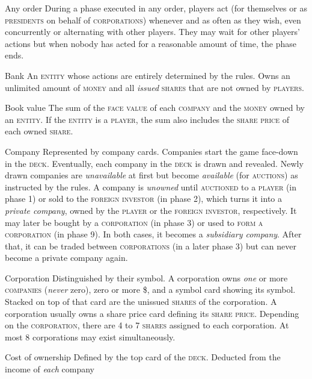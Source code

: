 \documentclass[11pt,a4paper]{article}
\newenvironment{my_description}
  {\begin{list}{}{\setlength{\labelwidth}{0pt}
   \leftmargin=1.2em
   \setlength{\itemindent}{-\leftmargin}
   \renewcommand{\makelabel}{\descriptionlabel}}
  \setlength{\itemsep}{1pt}
  \setlength{\parskip}{0pt}
  \setlength{\parsep}{0pt}
  }
  {\end{list}}
\begin{document}
\begin{multicols}{2}
{\begin{my_description}
\item[Any order] During a phase executed in any order, players act (for
  themselves or as \textsc{presidents} on behalf of
  \textsc{corporations}) whenever and as often as they wish, even
  concurrently or alternating with other players. They may wait for
  other players' actions but when nobody has acted for a reasonable
  amount of time, the phase ends.
\item[Bank] An \textsc{entity} whose actions are entirely determined
  by the rules. Owns an unlimited amount of \textsc{money} and all
  \emph{issued} \textsc{shares} that are not owned by
  \textsc{players}.
\item[Book value] The sum of the \textsc{face value} of each
  \textsc{company} and the \textsc{money} owned by an
  \textsc{entity}. If the \textsc{entity} is a \textsc{player}, the
  sum also includes the \textsc{share price} of each owned
  \textsc{share}.
\item[Company] Represented by company cards. Companies start the game
  face-down in the \textsc{deck}. Eventually, each company in the
  \textsc{deck} is drawn and revealed. Newly drawn companies are
  \emph{unavailable} at first but become \emph{available} (for
  \textsc{auctions}) as instructed by the rules. A company is
  \emph{unowned} until \textsc{auctioned} to a \textsc{player} (in
  phase 1) or sold to the \textsc{foreign investor} (in phase 2),
  which turns it into a \emph{private company}, owned by the
  \textsc{player} or the \textsc{foreign investor}, respectively. It
  may later be bought by a \textsc{corporation} (in phase 3) or used
  to \textsc{form a corporation} (in phase 9). In both cases, it
  becomes a \emph{subsidiary company}. After that, it can be traded
  between \textsc{corporations} (in a later phase 3) but can never
  become a private company again.
\item[Corporation] Distinguished by their symbol. A corporation owns
  \emph{one} or more \textsc{companies} (\emph{never} zero), zero or
  more \$, and a symbol card showing its symbol. Stacked on top of
  that card are the unissued \textsc{shares} of the corporation. A
  corporation usually owns a share price card defining its
  \textsc{share price}. Depending on the \textsc{corporation}, there
  are 4 to 7 \textsc{shares} assigned to each corporation. At most 8
  corporations may exist simultaneously.
\item[Cost of ownership] Defined by the top card of the
  \textsc{deck}. Deducted from the income of \emph{each} company

\end{my_description}}
\end{multicols}
\end{document}
